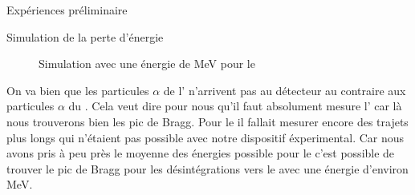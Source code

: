 \documentclass[a4paper,11pt]{scrartcl}
\begin{document}
\begin{section}{Expériences préliminaire}
\begin{subsection}{Simulation de la perte d'énergie}
\begin{figure}[H]
\begin{minipage}{0.45\textwidth}
     \caption{Simulation avec une énergie de \unit[7]{MeV} pour le }
    \end{minipage}
   \end{figure}
   On va bien que les particules $\alpha$ de l' n'arrivent pas au détecteur au contraire aux particules $\alpha$ du . Cela veut dire pour nous qu'il faut absolument mesure l' car là nous trouverons bien les pic de Bragg. Pour le  il fallait mesurer encore des trajets plus longs qui n'étaient pas possible avec notre dispositif éxperimental. Car nous avons pris à peu près le moyenne des énergies possible pour le  c'est possible de trouver le pic de Bragg pour les désintégrations vers le  avec une énergie d'environ \unit[6]{MeV}.
  \end{subsection}
 \end{section}
\end{document}
